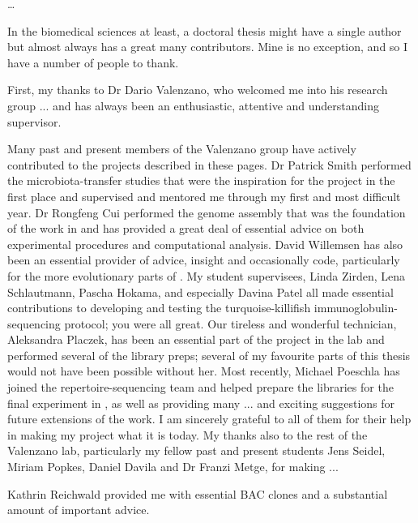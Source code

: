 
\begin{acknowledgements}      

\dots

In the biomedical sciences at least, a doctoral thesis might have a single author but almost always has a great many contributors. Mine is no exception, and so I have a number of people to thank.

First, my thanks to Dr Dario Valenzano, who welcomed me into his research group ... %
and has always been an enthusiastic, attentive and understanding supervisor.

Many past and present members of the Valenzano group have actively contributed to the projects described in these pages. Dr Patrick Smith performed the microbiota-transfer studies that were the inspiration for the project in the first place and supervised and mentored me through my first and most difficult year. Dr Rongfeng Cui performed the genome assembly that was the foundation of the work in  and has provided a great deal of essential advice on both experimental procedures and computational analysis. David Willemsen has also been an essential provider of advice, insight and occasionally code, particularly for the more evolutionary parts of . My student supervisees, Linda Zirden, Lena Schlautmann, Pascha Hokama, and especially Davina Patel all made essential contributions to developing and testing the turquoise-killifish immunoglobulin-sequencing protocol; you were all great. Our tireless and wonderful technician, Aleksandra Placzek, has been an essential part of the \igseq project in the lab and performed several of the library preps; several of my favourite parts of this thesis would not have been possible without her. Most recently, Michael Poeschla has joined the repertoire-sequencing team and helped prepare the libraries for the final \igseq experiment in , as well as providing many ... and exciting suggestions for future extensions of the work. I am sincerely grateful to all of them for their help in making my project what it is today. My thanks also to the rest of the Valenzano lab, particularly my fellow past and present students Jens Seidel, Miriam Popkes, Daniel Davila and Dr Franzi Metge, for making ...



Kathrin Reichwald provided me with essential BAC clones and a substantial amount of important advice.  


\end{acknowledgements}

